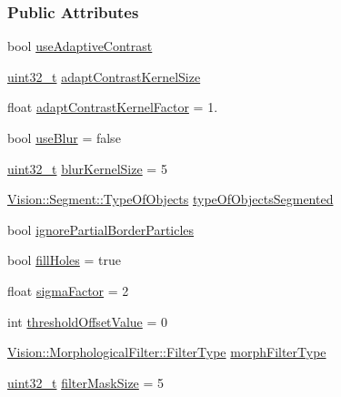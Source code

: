 \subsubsection*{Public Attributes}
\begin{DoxyCompactItemize}
\item 
bool \hyperlink{class_soil_analyzer_1_1_soil_settings_a0e27335d05aed8f3f084744062368578}{use\+Adaptive\+Contrast}
\item 
\hyperlink{_soil_math_types_8h_a435d1572bf3f880d55459d9805097f62}{uint32\+\_\+t} \hyperlink{class_soil_analyzer_1_1_soil_settings_a73f627b092dbdbda37b66ef6c2eef95c}{adapt\+Contrast\+Kernel\+Size}
\item 
float \hyperlink{class_soil_analyzer_1_1_soil_settings_ace12c0f4bc35d420ef528cc390fc2cdb}{adapt\+Contrast\+Kernel\+Factor} = 1.
\item 
bool \hyperlink{class_soil_analyzer_1_1_soil_settings_a21bd246a48a712734af86f592030e18b}{use\+Blur} = false
\item 
\hyperlink{_soil_math_types_8h_a435d1572bf3f880d55459d9805097f62}{uint32\+\_\+t} \hyperlink{class_soil_analyzer_1_1_soil_settings_afa46542d30045e00fadbdd5a6ab9a1e1}{blur\+Kernel\+Size} = 5
\item 
\hyperlink{class_vision_1_1_segment_ac3ddf2c72ee6333007510b680db1e7dd}{Vision\+::\+Segment\+::\+Type\+Of\+Objects} \hyperlink{class_soil_analyzer_1_1_soil_settings_a21ae88dba6b9b0b07d9c26812bc739fb}{type\+Of\+Objects\+Segmented}
\item 
bool \hyperlink{class_soil_analyzer_1_1_soil_settings_a24fb1d7da2247da77a17d853ea1494d7}{ignore\+Partial\+Border\+Particles}
\item 
bool \hyperlink{class_soil_analyzer_1_1_soil_settings_a2c9dbe9429742aed1da9d9683da5cc1e}{fill\+Holes} = true
\item 
float \hyperlink{class_soil_analyzer_1_1_soil_settings_a97e62512e12a2ba9210fd93950b6e717}{sigma\+Factor} = 2
\item 
int \hyperlink{class_soil_analyzer_1_1_soil_settings_a48330eb812672b50a94483f264614e8f}{threshold\+Offset\+Value} = 0
\item 
\hyperlink{class_vision_1_1_morphological_filter_a1f19c9cb13f0d68778c77d6fd0370868}{Vision\+::\+Morphological\+Filter\+::\+Filter\+Type} \hyperlink{class_soil_analyzer_1_1_soil_settings_ad1420c4800badb3eb07eba4767e3df81}{morph\+Filter\+Type}
\item 
\hyperlink{_soil_math_types_8h_a435d1572bf3f880d55459d9805097f62}{uint32\+\_\+t} \hyperlink{class_soil_analyzer_1_1_soil_settings_ad9d5071bbf6d10638df024e883c6199f}{filter\+Mask\+Size} = 5

\end{DoxyCompactItemize}
